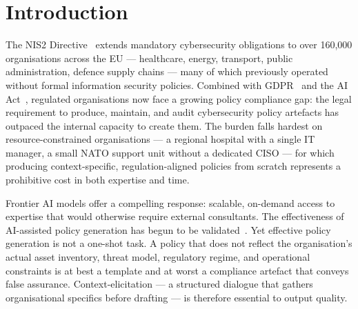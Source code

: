 \documentclass[runningheads]{llncs}
\begin{document}


\section{Introduction}

The NIS2 Directive~\cite{nis22022} extends mandatory cybersecurity
obligations to over 160,000 organisations across the EU --- healthcare,
energy, transport, public administration, defence supply chains --- many of
which previously operated without formal information security policies.
Combined with GDPR~\cite{gdpr2016} and the AI Act~\cite{aiact2024}, regulated
organisations now face a growing policy compliance gap: the legal requirement
to produce, maintain, and audit cybersecurity policy artefacts has outpaced
the internal capacity to create them. The burden falls hardest on
resource-constrained organisations --- a regional hospital with a single IT
manager, a small NATO support unit without a dedicated CISO --- for which
producing context-specific, regulation-aligned policies from scratch
represents a prohibitive cost in both expertise and time.

Frontier AI models offer a compelling response: scalable, on-demand access
to expertise that would otherwise require external consultants.
The effectiveness of AI-assisted policy generation has begun to be
validated~\cite{mcintosh2023harnessing,jawhar2024aibased}. Yet effective
policy generation is not a one-shot task. A policy that does not reflect the
organisation's actual asset inventory, threat model, regulatory regime, and
operational constraints is at best a template and at worst a compliance
artefact that conveys false assurance. Context-elicitation --- a structured
dialogue that gathers organisational specifics before drafting --- is
therefore essential to output quality.
\end{document}

